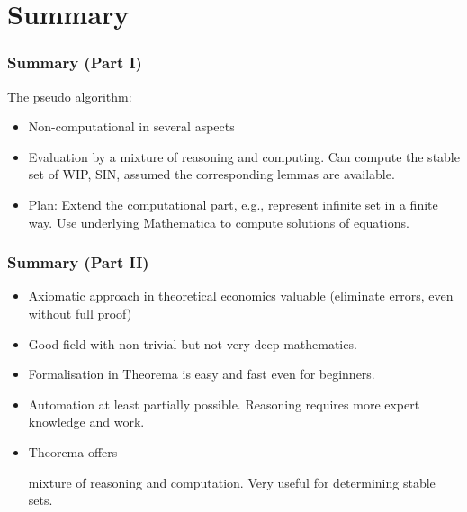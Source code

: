\documentclass{beamer}
\def\mcolor#1#2{\rule{0ex}{0ex}\color{#1}#2\color{black}{}}
\begin{document}





\section{Summary}
\begin{frame}
\frametitle{Summary (Part I)}

The pseudo algorithm:
\begin{itemize}
\item \mcolor{blue}{Non-computational in several aspects}
\item \mcolor{blue}{Evaluation by a mixture of reasoning and
    computing}.  Can compute the stable set of WIP, SIN, assumed the
  corresponding lemmas are available.
\item \mcolor{blue}{Plan:} Extend the computational part, e.g.,
  represent infinite set in a finite way. Use underlying Mathematica
  to compute solutions of equations.
\end{itemize}
\end{frame}


\begin{frame}
\frametitle{Summary (Part II)}

\begin{itemize}
\item Axiomatic approach in theoretical economics valuable (eliminate errors, even without full proof)
\item Good field with non-trivial but not very deep mathematics.
\item \mcolor{blue}{Formalisation} in Theorema is easy and fast even for beginners.
\item \mcolor{blue}{Automation} at least partially possible. Reasoning requires more expert knowledge and work. 
\item Theorema offers \mcolor{blue}{mixture of reasoning and
    computation}.  Very useful for determining stable sets.
\end{itemize}
\end{frame}
\end{document}

